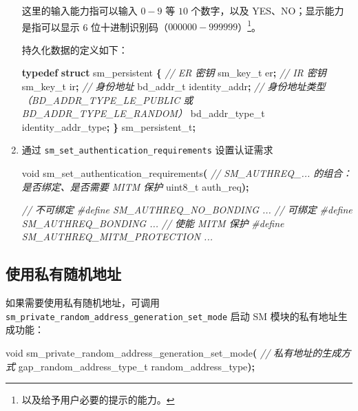 \documentclass[
  12pt,
]{book}
\newenvironment{Shaded}{\begin{snugshade}}{\end{snugshade}}
\newcommand{\CommentTok}[1]{\textcolor[rgb]{0.56,0.35,0.01}{\textit{#1}}}
\newcommand{\DataTypeTok}[1]{\textcolor[rgb]{0.13,0.29,0.53}{#1}}
\newcommand{\KeywordTok}[1]{\textcolor[rgb]{0.13,0.29,0.53}{\textbf{#1}}}
\newcommand{\NormalTok}[1]{#1}
\newcommand{\OperatorTok}[1]{\textcolor[rgb]{0.81,0.36,0.00}{\textbf{#1}}}
\newcommand{\PreprocessorTok}[1]{\textcolor[rgb]{0.56,0.35,0.01}{\textit{#1}}}
\begin{document}
\begin{enumerate}
  这里的输入能力指可以输入 \(0-9\) 等 \(10\) 个数字，以及 YES、NO；显示能力是指可以显示 6 位十进制识别码（\(000000-999999\)）\footnote{以及给予用户必要的提示的能力。}。

  持久化数据的定义如下：

\begin{Shaded}
\begin{Highlighting}[]
\KeywordTok{typedef} \KeywordTok{struct}\NormalTok{ sm\_persistent}
\OperatorTok{\{}
  \CommentTok{// ER 密钥}
\NormalTok{  sm\_key\_t        er}\OperatorTok{;}
  \CommentTok{// IR 密钥}
\NormalTok{  sm\_key\_t        ir}\OperatorTok{;}
  \CommentTok{// 身份地址}
\NormalTok{  bd\_addr\_t       identity\_addr}\OperatorTok{;}
  \CommentTok{// 身份地址类型（BD\_ADDR\_TYPE\_LE\_PUBLIC 或 BD\_ADDR\_TYPE\_LE\_RANDOM）}
\NormalTok{  bd\_addr\_type\_t  identity\_addr\_type}\OperatorTok{;}
\OperatorTok{\}}\NormalTok{ sm\_persistent\_t}\OperatorTok{;}
\end{Highlighting}
\end{Shaded}
\item
  通过 \texttt{sm\_set\_authentication\_requirements} 设置认证需求

\begin{Shaded}
\begin{Highlighting}[]
\DataTypeTok{void}\NormalTok{ sm\_set\_authentication\_requirements}\OperatorTok{(}
  \CommentTok{// SM\_AUTHREQ\_... 的组合：是否绑定、是否需要 MITM 保护}
  \DataTypeTok{uint8\_t}\NormalTok{ auth\_req}\OperatorTok{);}

\CommentTok{// 不可绑定}
\PreprocessorTok{\#define SM\_AUTHREQ\_NO\_BONDING       ...}
\CommentTok{// 可绑定}
\PreprocessorTok{\#define SM\_AUTHREQ\_BONDING          ...}
\CommentTok{// 使能 MITM 保护}
\PreprocessorTok{\#define SM\_AUTHREQ\_MITM\_PROTECTION  ...}
\end{Highlighting}
\end{Shaded}
\end{enumerate}

\hypertarget{ux4f7fux7528ux79c1ux6709ux968fux673aux5730ux5740}{%
\subsection{使用私有随机地址}\label{ux4f7fux7528ux79c1ux6709ux968fux673aux5730ux5740}}

如果需要使用私有随机地址，可调用 \texttt{sm\_private\_random\_address\_generation\_set\_mode} 启动 SM 模块的私有地址生成功能：

\begin{Shaded}
\begin{Highlighting}[]
\DataTypeTok{void}\NormalTok{ sm\_private\_random\_address\_generation\_set\_mode}\OperatorTok{(}
  \CommentTok{// 私有地址的生成方式}
\NormalTok{  gap\_random\_address\_type\_t random\_address\_type}\OperatorTok{);}
\end{Highlighting}
\end{Shaded}
\end{document}
